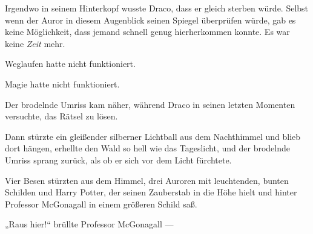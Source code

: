 Irgendwo in seinem Hinterkopf wusste Draco, dass er gleich sterben würde. Selbst wenn der Auror in diesem Augenblick seinen Spiegel überprüfen würde, gab es keine Möglichkeit, dass jemand schnell genug hierherkommen konnte. Es war keine \emph{Zeit} mehr.

Weglaufen hatte nicht funktioniert.

Magie hatte nicht funktioniert.

Der brodelnde Umriss kam näher, während Draco in seinen letzten Momenten versuchte, das Rätsel zu lösen.

Dann stürzte ein gleißender silberner Lichtball aus dem Nachthimmel und blieb dort hängen, erhellte den Wald so hell wie das Tageslicht, und der brodelnde Umriss sprang zurück, als ob er sich vor dem Licht fürchtete.

Vier Besen stürzten aus dem Himmel, drei Auroren mit leuchtenden, bunten Schilden und Harry Potter, der seinen Zauberstab in die Höhe hielt und hinter Professor McGonagall in einem größeren Schild saß.

„Raus hier!“ brüllte Professor McGonagall —

